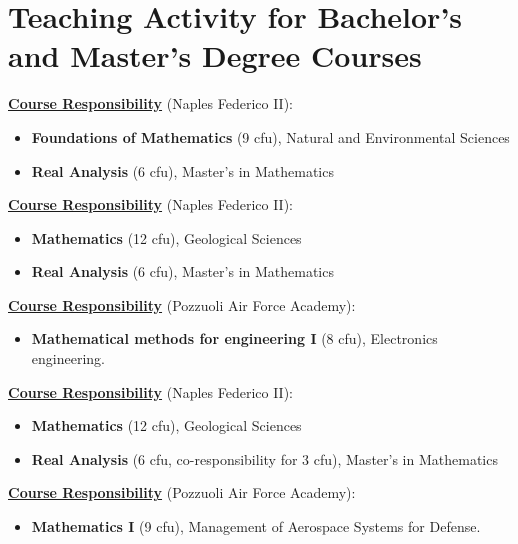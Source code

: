 \documentclass[11pt,a4paper,sans,colorlinks,linkcolor=green]{moderncv}
\begin{document}
\section{Teaching Activity for Bachelor's and Master's Degree Courses}
{\textbf{\underline{Course Responsibility}} (Naples Federico II):
  \begin{itemize}
  \item[$\textcolor{color1}{\circ}$] \textbf{Foundations of Mathematics} (9 cfu), Natural and Environmental Sciences
  \item[$\textcolor{color1}{\circ}$] \textbf{Real Analysis} (6 cfu), Master's in Mathematics
  \end{itemize}
  \vspace{-.6cm}\phantom{x}
}
{\textbf{\underline{Course Responsibility}} (Naples Federico II):
  \begin{itemize}
  \item[$\textcolor{color1}{\circ}$]  \textbf{Mathematics} (12 cfu),
     Geological Sciences
\item[$\textcolor{color1}{\circ}$] \textbf{Real Analysis} (6 cfu), Master's in Mathematics
\end{itemize}
   \vspace{-.6cm}\phantom{x}
}
\cvitem{}
{\textbf{\underline{Course Responsibility}} (Pozzuoli Air Force Academy):
  \begin{itemize}
  \item[$\textcolor{color1}{\circ}$]  \textbf{Mathematical methods for engineering I} (8 cfu),
     Electronics engineering.
\end{itemize}
   \vspace{-.6cm}\phantom{x}
}
{\textbf{\underline{Course Responsibility}} (Naples Federico II):
  \begin{itemize}
  \item[$\textcolor{color1}{\circ}$]  \textbf{Mathematics} (12 cfu),
     Geological Sciences
\item[$\textcolor{color1}{\circ}$] \textbf{Real Analysis} (6 cfu, co-responsibility for 3 cfu), Master's in Mathematics
\end{itemize}
   \vspace{-.6cm}\phantom{x}
}
\cvitem{}
{\textbf{\underline{Course Responsibility}} (Pozzuoli Air Force Academy):
  \begin{itemize}
  \item[$\textcolor{color1}{\circ}$]  \textbf{Mathematics I} (9 cfu),
     Management of Aerospace Systems for Defense.
\end{itemize}
   \vspace{-.6cm}\phantom{x}
}
\end{document}
